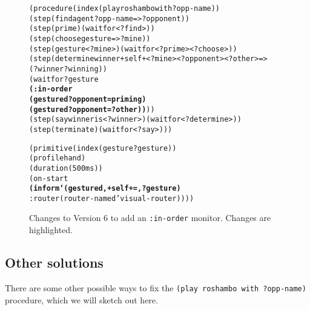 \documentclass[12pt]{article}
\newcommand{\ic}{\texttt}
\newenvironment{code}%
   {\begin{alltt}}%
   {\end{alltt}}
\newcommand{\codebf}[1]{{\bf #1}}
\newenvironment{float}%
   {\begin{center}}%
   {\end{center}
   }
\begin{document}
\begin{figure}
\begin{float}
\begin{code}
(procedure (index (play roshambo with ?opp-name))
  (step (find agent ?opp-name => ?opponent))
  (step (prime) (waitfor <?find>))
  (step (choose gesture => ?mine))
  (step (gesture <?mine>) (waitfor <?prime> <?choose>))
  (step (determine winner +self+ <?mine> <?opponent> <?other> => 
          (?winner ?winning))
          (waitfor ?gesture 
             \codebf{(:in-order
                    (gestured ?opponent = priming)
                    (gestured ?opponent = ?other))}))
  (step (say winner is <?winner>) (waitfor <?determine>))
  (step (terminate) (waitfor <?say>)))
             
(primitive (index (gesture ?gesture))
  (profile hand)
  (duration (500 ms))
  (on-start
   \codebf{(inform `(gestured ,+self+ = ,?gesture)}
	   :router (router-named 'visual-router))))
\end{code}
\end{float}
\caption{Changes to Version 6 to add an \ic{:in-order} monitor. Changes are highlighted.\label{fig.roshambo.6.fixed}}
\end{figure}

\subsection*{Other solutions}

There are some other possible ways to fix the \ic{(play roshambo with ?opp-name)} procedure, which we will sketch out here.
\end{document}
